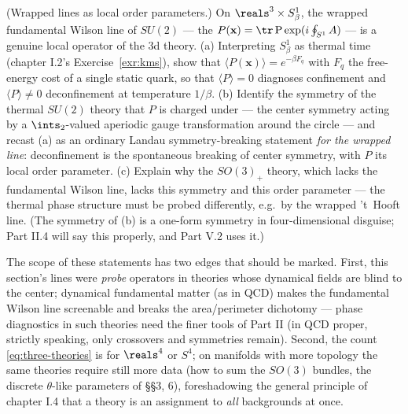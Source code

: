 \begin{exercise}[medium]
\label{exr:wrapped-lines}
(Wrapped lines as local order parameters.) On $\reals^3 \times
S^1_\beta$, the wrapped fundamental Wilson line of $SU(2)$ --- the
 $P(\mathbf{x}) = \tr\,\mathrm{P}
\exp(i\oint_{S^1} A)$ --- is a genuine local operator of the 3d theory.
(a) Interpreting $S^1_\beta$ as thermal time (chapter I.2's
Exercise~\ref{exr:kms}), show that $\langle P(\mathbf{x})\rangle =
e^{-\beta F_q}$ with $F_q$ the free-energy cost of a single static
quark, so that $\langle P \rangle = 0$ diagnoses confinement and
$\langle P\rangle \neq 0$ deconfinement at temperature $1/\beta$. (b)
Identify the symmetry of the thermal $SU(2)$ theory that $P$ is charged
under --- the center symmetry acting by a $\ints_2$-valued aperiodic
gauge transformation around the circle --- and recast (a) as an
ordinary Landau symmetry-breaking statement \emph{for the wrapped
line}: deconfinement is the spontaneous breaking of center symmetry,
with $P$ its local order parameter. (c) Explain why the $SO(3)_+$
theory, which lacks the fundamental Wilson line, lacks this symmetry
and this order parameter --- the thermal phase structure must be probed
differently, e.g.\ by the wrapped 't~Hooft line. (The symmetry of (b)
is a one-form symmetry in four-dimensional disguise; Part II.4 will
say this properly, and Part V.2 uses it.)
\end{exercise}

\begin{nnote}
The scope of these statements has two edges that should be marked.
First, this section's lines were \emph{probe}
operators in theories whose dynamical fields are blind to the center;
dynamical fundamental matter (as in QCD) makes the fundamental Wilson
line screenable and breaks the area/perimeter dichotomy --- phase
diagnostics in such theories need the finer tools of Part II (in QCD
proper, strictly speaking, only crossovers and symmetries remain).
Second, the count \eqref{eq:three-theories} is for $\reals^4$ or $S^4$;
on manifolds with more topology the same theories require still more
data (how to sum the $SO(3)$ bundles, the discrete $\theta$-like
parameters of  \S\S3, 6), foreshadowing the general
principle of chapter I.4 that a theory is an assignment to \emph{all}
backgrounds at once.
\end{nnote}

